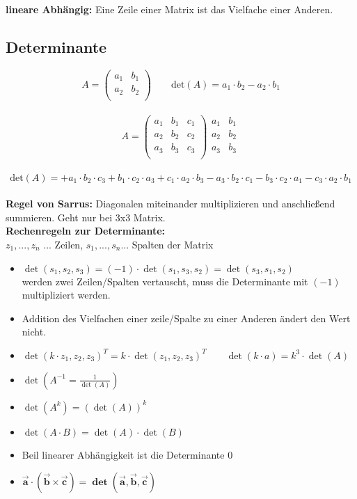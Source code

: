 
\textbf{lineare Abhängig:} Eine Zeile einer Matrix ist das Vielfache einer Anderen.\\

\subsection{Determinante}
\[A=\begin{pmatrix}
 a_1 & b_1 \\
 a_2 & b_2 \\
\end{pmatrix}\qquad \text{det}(A)=a_1 \cdot b_2 - a_2 \cdot b_1\]
\ \\
\[A=\begin{pmatrix}
 a_1 & b_1 & c_1 \\
 a_2 & b_2 & c_2 \\
 a_3 & b_3 & c_3 \\
\end{pmatrix}
\begin{matrix}
 a_1 & b_1 \\
 a_2 & b_2 \\
 a_3 & b_3 \\
\end{matrix}\]
\ \\
\[\text{det}(A)= + a_1 \cdot b_2 \cdot c_3 + b_1 \cdot c_2 \cdot a_3 + c_1 \cdot a_2 \cdot b_3 - a_3 \cdot b_2 \cdot c_1 - b_3 \cdot c_2 \cdot a_1 - c_3 \cdot a_2 \cdot b_1\]
\ \\
\textbf{Regel von Sarrus:} Diagonalen miteinander multiplizieren und anschließend summieren. Geht nur bei 3x3 Matrix.\\

\textbf{Rechenregeln zur Determinante:}\\
$z_1,...,z_n$ ... Zeilen, $s_1,...,s_n$... Spalten der Matrix
\begin{itemize}
    \item $\det(s_1,s_2,s_3) = (-1)\cdot \det (s_1,s_3,s_2) = \det(s_3,s_1,s_2)$\\
    werden zwei Zeilen/Spalten vertauscht, muss die Determinante mit $(-1)$ multipliziert werden.
    \item Addition des Vielfachen einer zeile/Spalte zu einer Anderen ändert den Wert nicht.
    \item $\det(k\cdot z_1,z_2,z_3)^T = k \cdot \det(z_1,z_2,z_3)^T \qquad \det(k\cdot a) = k^3\cdot  \det(A)$
    \item $\det(A^{-1} = \frac{1}{\det(A)})$
    \item $\det(A^k) = (\det(A))^k$
    \item $\det(A\cdot B) = \det (A)\cdot \det(B)$
    \item Beil linearer Abhängigkeit ist die Determinante 0
    \item $\bm{\vec{a}\cdot (\vec{b}\times \vec{c})=\det(\vec{a}, \vec{b}, \vec{c})}$
\end{itemize}

